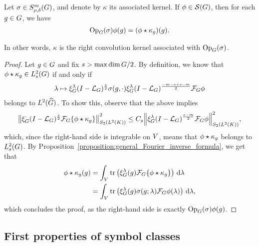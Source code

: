 \begin{proposition}[Quantization]
\label{proposition:quantization}
    Let $\sigma \in \SymbolClass{m}{\rho, \delta}$,
    and denote by $\kappa$ its associated kernel.
    If $\phi \in \Schwartz\Group$, then for each $g \in \Group$, we have
    \begin{align*}
        \Op(\sigma) \phi(g) = (\conv{\phi}{\kappa_g})(g).
    \end{align*}

    In other words, $\kappa$ is the right convolution kernel associated with $\Op(\sigma)$.
\end{proposition}
\begin{proof}
    Let $g \in \Group$ and fix $s > \max \dim \Group/2$.
    By definition, we know that $\conv \phi \kappa_g \in \Sobolev s$ if and only if
    \begin{align*}
        \lambda \mapsto
        \Rep \lambda \BesselPotential s \sigma(g, \dummy) \Rep \lambda \BesselPotential {-m - s + s - m} \Fourier \phi
    \end{align*}
    belongs to $\LebesgueDual 2 \Group$.
    To show this,
    observe that the above implies
    \begin{align*}
        \norm[\SchattenClasses 2 {\Lebesgue 2 \CompactGroup}] {\Rep \dummy \BesselPotential s \Fourier \{\conv \phi {\kappa_g}\}}^2
        \leq C_s \norm[\SchattenClasses 2 {\Lebesgue 2 \CompactGroup}] {\Rep \lambda \BesselPotential {s - m}\Fourier \phi}^2,
    \end{align*}
    which, since the right-hand side is integrable on $\VectorSpace$,
    means that $\conv \phi {\kappa_g}$ belongs to $\Sobolev s$.
    By Proposition~\ref{proposition:general_Fourier_inverse_formula},
    we get that
    \begin{align*}
        \conv \phi {\kappa_g}(g)
        &= \int_\VectorSpace \tr\left(\Rep \lambda(g) \Fourier \{\conv \phi {\kappa_g}\}\right) \dd \lambda\\
        &= \int_\VectorSpace \tr\left(\Rep \lambda(g) \sigma(g; \lambda) \Fourier \phi(\lambda)\right) \dd \lambda,
    \end{align*}
    which concludes the proof,
    as the right-hand side is exactly $\Op(\sigma) \phi(g)$.
\end{proof}

\subsection{First properties of symbol classes}

